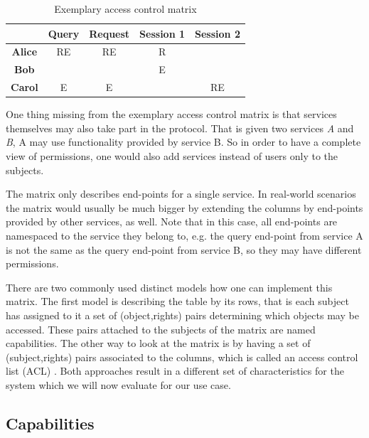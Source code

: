 \begin{table}
    \centering
    \begin{tabular}{|c|c|c|c|c|}
        \hline
              & \bfseries Query & \bfseries Request & \bfseries Session 1 & \bfseries Session 2\\
        \hline
        \bfseries Alice & RE    & RE      & R         &\\
        \hline
        \bfseries Bob   &       &         & E         &\\
        \hline
        \bfseries Carol & E     & E       &           & RE\\
        \hline
    \end{tabular}

    \caption{Exemplary access control matrix}
    \label{tab:access-control-matrix}
\end{table}

One thing missing from the exemplary access control matrix is that services themselves may also take part in the protocol.
That is given two services \emph{A} and \emph{B}, A may use functionality provided by service B.
So in order to have a complete view of permissions, one would also add services instead of users only to the subjects.

The matrix only describes end-points for a single service.
In real-world scenarios the matrix would usually be much bigger by extending the columns by end-points provided by other services, as well.
Note that in this case, all end-points are namespaced to the service they belong to, e.g. the query end-point from service A is not the same as the query end-point from service B, so they may have different permissions.


There are two commonly used distinct models how one can implement this matrix.
The first model is describing the table by its rows, that is each subject has assigned to it a set of (object,rights) pairs determining which objects may be accessed.
These pairs attached to the subjects of the matrix are named capabilities.
The other way to look at the matrix is by having a set of (subject,rights) pairs associated to the columns, which is called an access control list (ACL) \cite{tanenbaum2014modern}.
Both approaches result in a different set of characteristics for the system which we will now evaluate for our use case.

\subsection{Capabilities}


